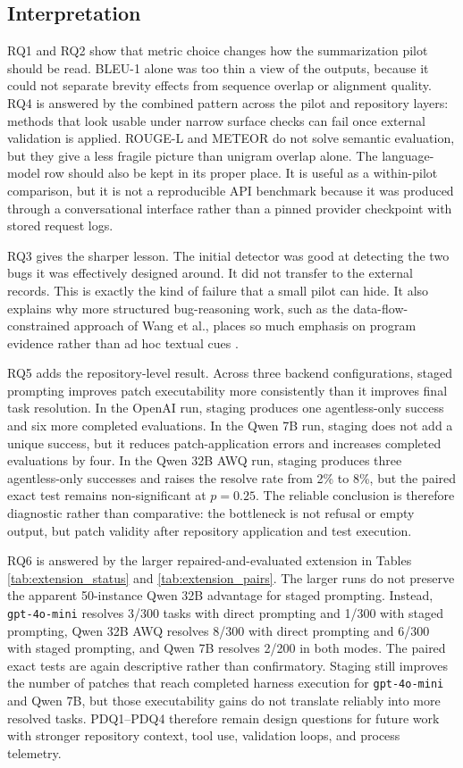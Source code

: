 \documentclass[preprint,12pt]{elsarticle}
\begin{document}
\subsection{Interpretation}

RQ1 and RQ2 show that metric choice changes how the summarization pilot should be read. BLEU-1 alone was too thin a view of the outputs, because it could not separate brevity effects from sequence overlap or alignment quality. RQ4 is answered by the combined pattern across the pilot and repository layers: methods that look usable under narrow surface checks can fail once external validation is applied. ROUGE-L and METEOR do not solve semantic evaluation, but they give a less fragile picture than unigram overlap alone. The language-model row should also be kept in its proper place. It is useful as a within-pilot comparison, but it is not a reproducible API benchmark because it was produced through a conversational interface rather than a pinned provider checkpoint with stored request logs.

RQ3 gives the sharper lesson. The initial detector was good at detecting the two bugs it was effectively designed around. It did not transfer to the external records. This is exactly the kind of failure that a small pilot can hide. It also explains why more structured bug-reasoning work, such as the data-flow-constrained approach of Wang et al., places so much emphasis on program evidence rather than ad hoc textual cues \cite{wang2024llmsan}.

RQ5 adds the repository-level result. Across three backend configurations, staged prompting improves patch executability more consistently than it improves final task resolution. In the OpenAI run, staging produces one agentless-only success and six more completed evaluations. In the Qwen 7B run, staging does not add a unique success, but it reduces patch-application errors and increases completed evaluations by four. In the Qwen 32B AWQ run, staging produces three agentless-only successes and raises the resolve rate from 2\% to 8\%, but the paired exact test remains non-significant at $p = 0.25$. The reliable conclusion is therefore diagnostic rather than comparative: the bottleneck is not refusal or empty output, but patch validity after repository application and test execution.

RQ6 is answered by the larger repaired-and-evaluated extension in Tables \ref{tab:extension_status} and \ref{tab:extension_pairs}. The larger runs do not preserve the apparent 50-instance Qwen 32B advantage for staged prompting. Instead, \texttt{gpt-4o-mini} resolves 3/300 tasks with direct prompting and 1/300 with staged prompting, Qwen 32B AWQ resolves 8/300 with direct prompting and 6/300 with staged prompting, and Qwen 7B resolves 2/200 in both modes. The paired exact tests are again descriptive rather than confirmatory. Staging still improves the number of patches that reach completed harness execution for \texttt{gpt-4o-mini} and Qwen 7B, but those executability gains do not translate reliably into more resolved tasks. PDQ1--PDQ4 therefore remain design questions for future work with stronger repository context, tool use, validation loops, and process telemetry.
\end{document}
